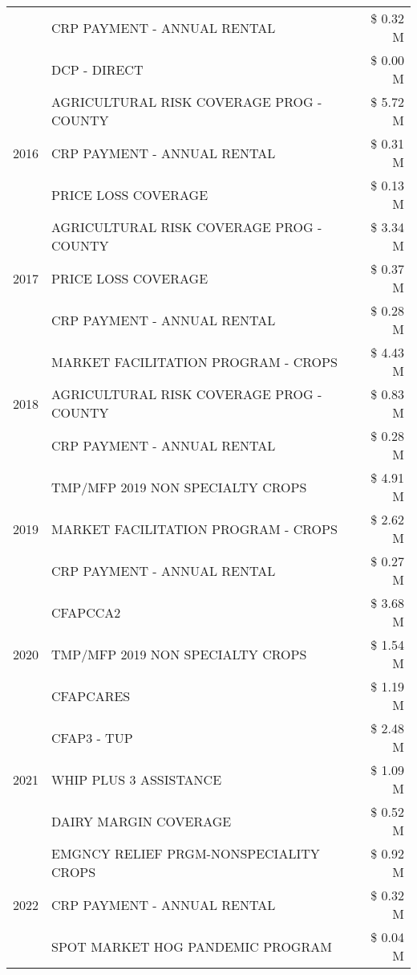 \begin{tabular}{llr}
 & CRP PAYMENT - ANNUAL RENTAL & \$ 0.32 M \\
 & DCP - DIRECT & \$ 0.00 M \\
\cline{1-3}
\multirow[t]{3}{*}{2016} & AGRICULTURAL RISK COVERAGE PROG - COUNTY & \$ 5.72 M \\
 & CRP PAYMENT - ANNUAL RENTAL & \$ 0.31 M \\
 & PRICE LOSS COVERAGE & \$ 0.13 M \\
\cline{1-3}
\multirow[t]{3}{*}{2017} & AGRICULTURAL RISK COVERAGE PROG - COUNTY & \$ 3.34 M \\
 & PRICE LOSS COVERAGE & \$ 0.37 M \\
 & CRP PAYMENT - ANNUAL RENTAL & \$ 0.28 M \\
\cline{1-3}
\multirow[t]{3}{*}{2018} & MARKET FACILITATION PROGRAM - CROPS & \$ 4.43 M \\
 & AGRICULTURAL RISK COVERAGE PROG - COUNTY & \$ 0.83 M \\
 & CRP PAYMENT - ANNUAL RENTAL & \$ 0.28 M \\
\cline{1-3}
\multirow[t]{3}{*}{2019} & TMP/MFP 2019 NON SPECIALTY CROPS & \$ 4.91 M \\
 & MARKET FACILITATION PROGRAM - CROPS & \$ 2.62 M \\
 & CRP PAYMENT - ANNUAL RENTAL & \$ 0.27 M \\
\cline{1-3}
\multirow[t]{3}{*}{2020} & CFAPCCA2 & \$ 3.68 M \\
 & TMP/MFP 2019 NON SPECIALTY CROPS & \$ 1.54 M \\
 & CFAPCARES & \$ 1.19 M \\
\cline{1-3}
\multirow[t]{3}{*}{2021} & CFAP3 - TUP & \$ 2.48 M \\
 & WHIP PLUS 3 ASSISTANCE & \$ 1.09 M \\
 & DAIRY MARGIN COVERAGE & \$ 0.52 M \\
\cline{1-3}
\multirow[t]{3}{*}{2022} & EMGNCY RELIEF PRGM-NONSPECIALITY CROPS & \$ 0.92 M \\
 & CRP PAYMENT - ANNUAL RENTAL & \$ 0.32 M \\
 & SPOT MARKET HOG PANDEMIC PROGRAM & \$ 0.04 M \\
\cline{1-3}
\bottomrule
\end{tabular}
